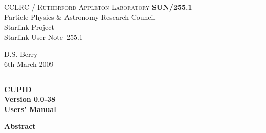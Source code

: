 \documentclass[twoside,11pt]{article}
\newcommand{\stardoccategory}  {Starlink User Note}
\newcommand{\stardocinitials}  {SUN}
\newcommand{\stardocnumber}    {255.1}
\newcommand{\stardocauthors}   {D.S. Berry}
\newcommand{\stardocdate}      {6th March 2009}
\newcommand{\stardoctitle}     {CUPID}
\newcommand{\stardocversion}   {Version 0.0-38}
\newcommand{\stardocmanual}    {Users' Manual}
\newcommand{\stardocname}{\stardocinitials /\stardocnumber}
\newenvironment{latexonly}{}{}
\renewcommand{\_}{\texttt{\symbol{95}}}
\begin{document}
\thispagestyle{empty}

\begin{latexonly}
   CCLRC / \textsc{Rutherford Appleton Laboratory} \hfill \textbf{\stardocname}\\
   {\large Particle Physics \& Astronomy Research Council}\\
   {\large Starlink Project\\}
   {\large \stardoccategory\ \stardocnumber}
   \begin{flushright}
   \stardocauthors\\
   \stardocdate
   \end{flushright}
   \vspace{-4mm}
   \rule{\textwidth}{0.5mm}
   \vspace{5mm}
   \begin{center}
   {\Huge\textbf{\stardoctitle \\ [2.5ex]}}
   {\LARGE\textbf{\stardocversion \\ [4ex]}}
   {\Huge\textbf{\stardocmanual}}
   \end{center}
   \vspace{5mm}


   \vspace{5mm}
   \begin{center}
      {\Large\textbf{Abstract}}
   \end{center}
\end{latexonly}
\end{document}
